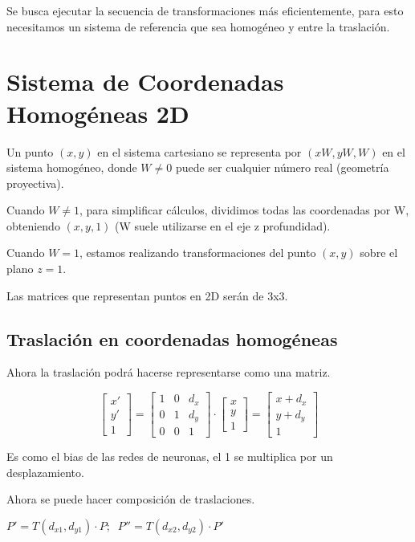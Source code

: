 Se busca ejecutar la secuencia de transformaciones más eficientemente, para esto necesitamos un sistema de referencia que sea homogéneo y entre la traslación.

\section{Sistema de Coordenadas Homogéneas 2D}
Un punto $( x , y )$ en el sistema cartesiano se representa por $( xW , yW , W )$ en el sistema homogéneo, donde $W\neq 0$ puede ser cualquier número real (geometría proyectiva).

Cuando $W\neq 1$, para simplificar cálculos, dividimos todas las coordenadas por W, obteniendo $( x , y , 1 )$ (W suele utilizarse en el eje z profundidad).

Cuando $W = 1$, estamos realizando transformaciones del punto $( x , y )$ sobre el plano $z = 1$.

Las matrices que representan puntos en 2D serán de 3x3.

\subsection{Traslación en coordenadas homogéneas}
Ahora la traslación podrá hacerse representarse como una matriz.

$$\left[\begin{matrix}
			x' \\ y' \\ 1
		\end{matrix}\right] =
	\left[\begin{matrix}
			1 & 0 & d_x \\ 0 & 1 & d_y \\ 0 & 0 & 1
		\end{matrix}\right] \cdot
	\left[\begin{matrix}
			x \\ y \\ 1
		\end{matrix}\right]=
	\left[\begin{matrix}
			x + d_x \\ y + d_y \\ 1
		\end{matrix}\right]$$

Es como el bias de las redes de neuronas, el 1 se multiplica por un desplazamiento.

Ahora se puede hacer composición de traslaciones.

$P'=T(d_{x1},d_{y1}) \cdot P; \;\;P''=T(d_{x2},d_{y2}) \cdot P'$

